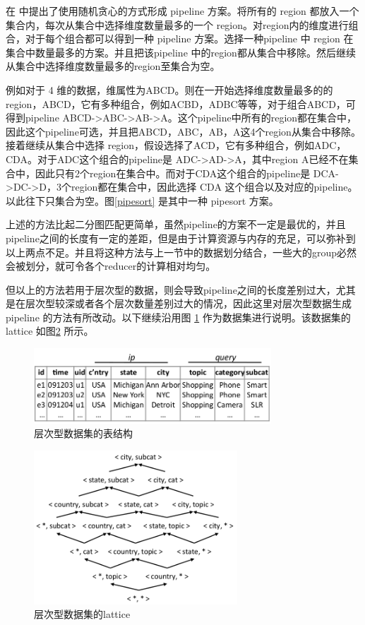 在\cite{wang2013scalable} 中提出了使用随机贪心的方式形成 pipeline 方案。将所有的 region 都放入一个集合内，每次从集合中选择维度数量最多的一个 region。对region内的维度进行组合，对于每个组合都可以得到一种 pipeline 方案。选择一种pipeline 中 region 在集合中数量最多的方案。并且把该pipeline 中的region都从集合中移除。然后继续从集合中选择维度数量最多的region至集合为空。

例如对于 4 维的数据，维属性为ABCD。则在一开始选择维度数量最多的的 region，ABCD，它有多种组合，例如ACBD，ADBC等等，对于组合ABCD，可得到pipeline ABCD-\textgreater ABC-\textgreater AB-\textgreater A。这个pipeline中所有的region都在集合中，因此这个pipeline可选，并且把ABCD，ABC，AB，A这4个region从集合中移除。接着继续从集合中选择 region，假设选择了ACD，它有多种组合，例如ADC，CDA。对于ADC这个组合的pipeline是  ADC-\textgreater AD-\textgreater A，其中region A已经不在集合中，因此只有2个region在集合中。而对于CDA这个组合的pipeline是  DCA-\textgreater DC-\textgreater D，3个region都在集合中，因此选择 CDA 这个组合以及对应的pipeline。以此往下只集合为空。图\ref{pipesort} 是其中一种 pipesort 方案。

上述的方法比起二分图匹配更简单，虽然pipeline的方案不一定是最优的，并且pipeline之间的长度有一定的差距，但是由于计算资源与内存的充足，可以弥补到以上两点不足。并且将这种方法与上一节中的数据划分结合，一些大的group必然会被划分，就可令各个reducer的计算相对均匀。

但以上的方法若用于层次型的数据，则会导致pipeline之间的长度差别过大，尤其是在层次型较深或者各个层次数量差别过大的情况，因此这里对层次型数据生成 pipeline 的方法有所改动。以下继续沿用图 \ref{dataset_table} 作为数据集进行说明。该数据集的 lattice 如图\ref{dataset_lattice} 所示。



\begin{figure}[!htb]
\centering\includegraphics[width=3.5in]{picture/ch_datacube_mr/dataset_table} 
\caption{层次型数据集的表结构}\label{dataset_table} 
\end{figure} 

\begin{figure}[!htb]
\centering\includegraphics[width=3in]{picture/ch_datacube_mr/dataset_lattice} 
\caption{层次型数据集的lattice}\label{dataset_lattice} 
\end{figure} 

